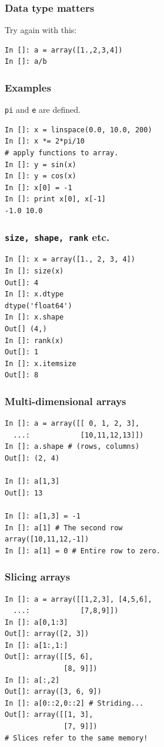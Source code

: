 \documentclass[14pt,compress]{beamer}
\newcommand{\typ}[1]{\lstinline{#1}}
\begin{document}
\begin{frame}[fragile]
  \frametitle{Data type matters}
  Try again with this:
\begin{lstlisting}
In []: a = array([1.,2,3,4])
In []: a/b
\end{lstlisting}
\end{frame}

\begin{frame}[fragile]
  \frametitle{Examples}
\noindent \typ{pi} and \typ{e} are defined.
\begin{lstlisting}
In []: x = linspace(0.0, 10.0, 200)
In []: x *= 2*pi/10
# apply functions to array.
In []: y = sin(x)
In []: y = cos(x)
In []: x[0] = -1
In []: print x[0], x[-1]
-1.0 10.0
\end{lstlisting}
\end{frame}

\begin{frame}[fragile]
    \frametitle{\typ{size, shape, rank} etc.}
\vspace*{-8pt}
\begin{lstlisting}
In []: x = array([1., 2, 3, 4])
In []: size(x)
Out[]: 4
In []: x.dtype
dtype('float64')
In []: x.shape
Out[] (4,)
In []: rank(x)
Out[]: 1
In []: x.itemsize
Out[]: 8
\end{lstlisting}
\end{frame}


\begin{frame}[fragile]
  \frametitle{Multi-dimensional arrays}
\begin{lstlisting}
In []: a = array([[ 0, 1, 2, 3],
  ...:            [10,11,12,13]])
In []: a.shape # (rows, columns)
Out[]: (2, 4)

In []: a[1,3]
Out[]: 13

In []: a[1,3] = -1
In []: a[1] # The second row
array([10,11,12,-1])
In []: a[1] = 0 # Entire row to zero.
\end{lstlisting}

\end{frame}

\begin{frame}[fragile]
  \frametitle{Slicing arrays}
  \vspace*{-0.2in}
\begin{lstlisting}
In []: a = array([[1,2,3], [4,5,6],
  ...:            [7,8,9]])
In []: a[0,1:3]
Out[]: array([2, 3])
In []: a[1:,1:]
Out[]: array([[5, 6],
              [8, 9]])
In []: a[:,2]
Out[]: array([3, 6, 9])
In []: a[0::2,0::2] # Striding...
Out[]: array([[1, 3],
              [7, 9]])
# Slices refer to the same memory!
\end{lstlisting}
\end{frame}
\end{document}

